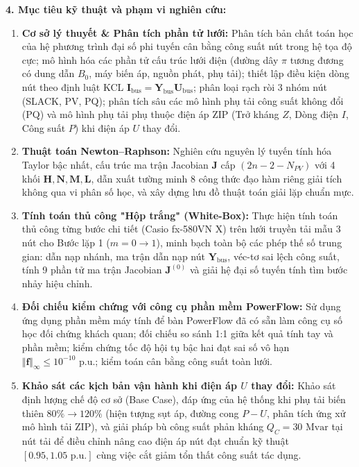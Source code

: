 \documentclass[12pt,a4paper,oneside]{report}
\begin{document}
\noindent \textbf{4. Mục tiêu kỹ thuật và phạm vi nghiên cứu:}
\begin{enumerate}
    \item \textbf{Cơ sở lý thuyết & Phân tích phần tử lưới:} Phân tích bản chất toán học của hệ phương trình đại số phi tuyến cân bằng công suất nút trong hệ tọa độ cực; mô hình hóa các phần tử cấu trúc lưới điện (đường dây $\pi$ tương đương có dung dẫn $B_0$, máy biến áp, nguồn phát, phụ tải); thiết lập điều kiện dòng nút theo định luật KCL $\mathbf{I}_{\text{bus}} = \mathbf{Y}_{\text{bus}}\mathbf{U}_{\text{bus}}$; phân loại rạch ròi 3 nhóm nút (SLACK, PV, PQ); phân tích sâu các mô hình phụ tải công suất không đổi (PQ) và mô hình phụ tải phụ thuộc điện áp ZIP (Trở kháng $Z$, Dòng điện $I$, Công suất $P$) khi điện áp $U$ thay đổi.
    \item \textbf{Thuật toán Newton--Raphson:} Nghiên cứu nguyên lý tuyến tính hóa Taylor bậc nhất, cấu trúc ma trận Jacobian $\mathbf{J}$ cấp $(2n - 2 - N_{PV})$ với 4 khối $\mathbf{H}, \mathbf{N}, \mathbf{M}, \mathbf{L}$, dẫn xuất tường minh 8 công thức đạo hàm riêng giải tích không qua vi phân số học, và xây dựng lưu đồ thuật toán giải lặp chuẩn mực.
    \item \textbf{Tính toán thủ công "Hộp trắng" (White-Box):} Thực hiện tính toán thủ công từng bước chi tiết (Casio fx-580VN X) trên lưới truyền tải mẫu 3 nút cho Bước lặp 1 ($m = 0 \to 1$), minh bạch toàn bộ các phép thế số trung gian: dẫn nạp nhánh, ma trận dẫn nạp nút $\mathbf{Y}_{\text{bus}}$, véc-tơ sai lệch công suất, tính 9 phần tử ma trận Jacobian $\mathbf{J}^{(0)}$ và giải hệ đại số tuyến tính tìm bước nhảy hiệu chỉnh.
    \item \textbf{Đối chiếu kiểm chứng với công cụ phần mềm PowerFlow:} Sử dụng ứng dụng phần mềm máy tính để bàn PowerFlow đã có sẵn làm công cụ số học đối chứng khách quan; đối chiếu so sánh 1:1 giữa kết quả tính tay và phần mềm; kiểm chứng tốc độ hội tụ bậc hai đạt sai số vô hạn $\Vert \mathbf{f} \Vert_\infty \le 10^{-10}\text{ p.u.}$; kiểm toán cân bằng công suất toàn lưới.
    \item \textbf{Khảo sát các kịch bản vận hành khi điện áp $U$ thay đổi:} Khảo sát định lượng chế độ cơ sở (Base Case), đáp ứng của hệ thống khi phụ tải biến thiên $80\% \to 120\%$ (hiện tượng sụt áp, đường cong $P-U$, phân tích ứng xử mô hình tải ZIP), và giải pháp bù công suất phản kháng $Q_C = 30\text{ Mvar}$ tại nút tải để điều chỉnh nâng cao điện áp nút đạt chuẩn kỹ thuật $[0.95, 1.05\text{ p.u.}]$ cùng việc cắt giảm tổn thất công suất tác dụng.
\end{enumerate}
\end{document}
